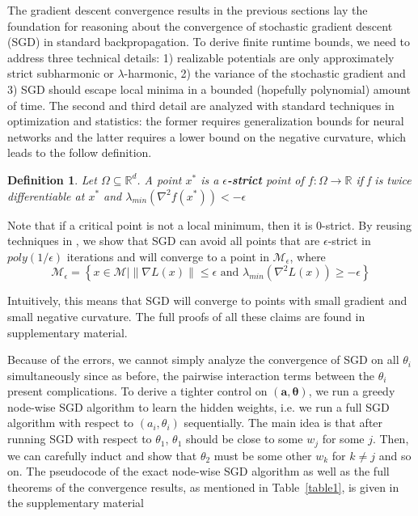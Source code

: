 \documentclass{article}
\newtheorem{definition}[theorem]{Definition}
\newcommand{\R}{{\mathbb{R}}}
\begin{document}
The gradient descent convergence results in the previous sections lay the foundation for reasoning about the convergence of stochastic gradient descent (SGD) in standard backpropagation. To derive finite runtime bounds, we need to address three technical details: 1) realizable potentials are only approximately strict subharmonic or $\lambda$-harmonic, 2) the variance of the stochastic gradient and 3) SGD should escape local minima in a bounded (hopefully polynomial) amount of time. The second and third detail are analyzed with standard techniques in optimization and statistics: the former requires generalization bounds for neural networks and the latter requires a lower bound on the negative curvature, which leads to the follow definition.
%
\begin{definition} 
Let $\Omega \subseteq \R^d$. A point $x^*$ is a
  {\bf $\epsilon$-strict} point of $f : \Omega \to \R$ if f is twice
  differentiable at $x^*$ and
  $\lambda_{min}(\nabla^2f(x^*)) < -\epsilon$
\end{definition}

Note that if a critical point is not a local minimum, then it is
$0$-strict. By reusing techniques in \cite{GeHJY15}, we show that SGD can avoid all points that are $\epsilon$-strict in $poly(1/\epsilon)$ iterations and will converge
to a point in $\mathcal{M}_\epsilon$, where 
%
\[\mathcal{M}_\epsilon = \left\{x\in \mathcal{M} \Big| \|\nabla L(x)\| \leq \epsilon \text{ and } \lambda_{min}(\nabla^2 L(x)) \geq -\epsilon\right\}\]

Intuitively, this means that SGD will converge to points with small gradient and small negative curvature. The full proofs of all these claims are found in supplementary material. 

Because of the errors, we cannot simply analyze the convergence of SGD
on all $\theta_i$ simultaneously since as before, the pairwise
interaction terms between the $\theta_i$ present complications. To
derive a tighter control on $(\boldsymbol{a,\theta})$, we run a greedy
node-wise SGD algorithm to learn the hidden weights, i.e. we run a
full SGD algorithm with respect to $(a_i,\theta_i)$ sequentially. The
main idea is that after running SGD with respect to $\theta_1$,
$\theta_1$ should be close to some $w_j$ for some $j$. Then, we can
carefully induct and show that $\theta_2$ must be some other $w_k$ for
$k\neq j$ and so on. The pseudocode of the exact node-wise SGD
algorithm as well as the full theorems of the convergence results, as
mentioned in Table~\ref{table1}, is given in the supplementary
material
\end{document}
